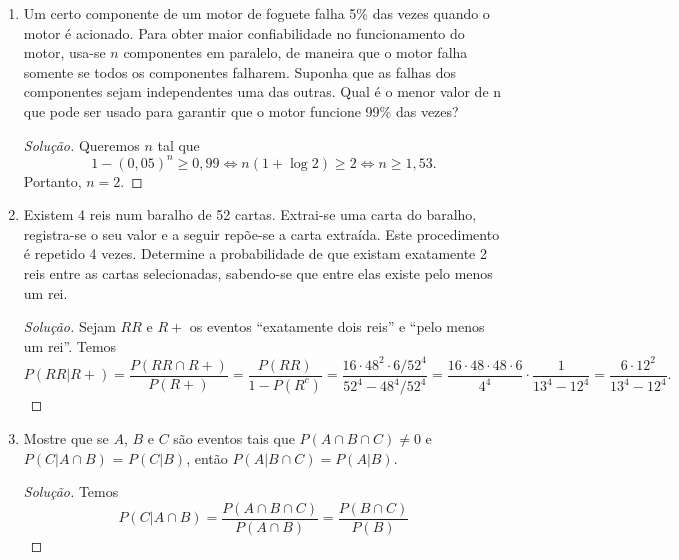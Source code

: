 \documentclass[../Notas.tex]{subfiles}
\begin{document}
\begin{enumerate}
    \begin{proof}[Solução]
        Temos
        \[
        P(\text{acomodar}) = 1 - P(\text{só 1 não vai}) - P(\text{todos vão})
                           = 1 - \frac{1}{5}\cdot 52\cdot\left(\frac{4}{5}\right)^{51} 
                           - \frac{4}{5}\left(\frac{4}{5}\right)^{51}
                           = 1 - \left(\frac{4}{5}\right)^{51}\cdot\frac{56}{5}.
        \]
    \end{proof}
    \item Um certo componente de um motor de foguete falha 5\% das vezes quando o motor é acionado. Para obter maior confiabilidade no funcionamento do motor, usa-se $n$ componentes em paralelo, de maneira que o motor falha somente se todos os componentes falharem. Suponha que as falhas dos componentes sejam independentes uma das outras. Qual é o menor valor de n que pode ser usado para garantir que o motor funcione 99\% das vezes?
    \begin{proof}[Solução]
        Queremos $n$ tal que
        \[
        1 - (0,05)^n \geq 0,99 \iff n(1 + \log 2) \geq 2 \iff n\geq 1,53.
        \]
        Portanto, $n=2$.
    \end{proof}
    \item Existem 4 reis num baralho de 52 cartas. Extrai-se uma carta do baralho, registra-se o seu valor e a seguir repõe-se a carta extraída. Este procedimento é repetido 4 vezes. Determine a probabilidade de que existam exatamente 2 reis entre as cartas selecionadas, sabendo-se que entre elas existe pelo menos um rei.
    \begin{proof}[Solução]
        Sejam $RR$ e $R+$ os eventos ``exatamente dois reis'' e ``pelo menos um rei''. Temos
        \[
        P(RR|R+) = \frac{P(RR\cap R+)}{P(R+)} 
                 = \frac{P(RR)}{1 - P(R^c)}
                 = \frac{16\cdot 48^2\cdot 6/52^4}{52^4 - 48^4/52^4}
                 = \frac{16\cdot 48\cdot 48\cdot 6}{4^4}\cdot\frac{1}{13^4 - 12^4}
                 = \frac{6\cdot 12^2}{13^4 - 12^4}.
        \]
    \end{proof}
    \item Mostre que se $A$, $B$ e $C$ são eventos tais que $P(A \cap B \cap C) \neq 0$ e $P(C|A \cap B)$ = $P(C|B)$, então $P(A|B \cap C) = P(A|B)$.
    \begin{proof}[Solução]
        Temos
        \[
        P(C|A\cap B) = \frac{P(A\cap B\cap C)}{P(A\cap B)}
                     = \frac{P(B\cap C)}{P(B)}
\]
\end{proof}
\end{enumerate}
\end{document}
